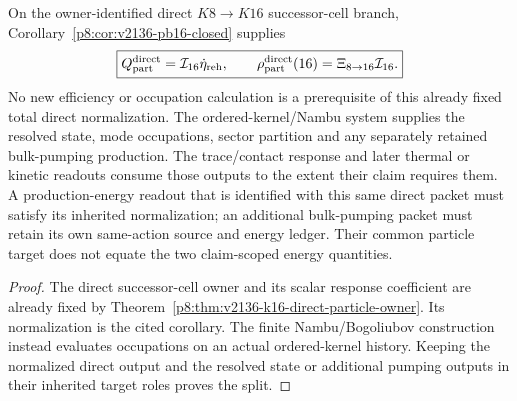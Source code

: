 \documentclass[12pt,a4paper]{article}
\begin{document}
\begin{corollary}
\label{p8:cor:v2186-c06-direct-energy-occupation-split}
On the owner-identified direct $K8\to K16$ successor-cell branch,
Corollary~\ref{p8:cor:v2136-pb16-closed} supplies
\[
 \boxed{Q_{\rm part}^{\rm direct}=\mathcal I_{16}\dot\eta_{\rm reh},
 \qquad \rho_{\rm part}^{\rm direct}(16)
 =\Xi_{8\to16}\mathcal I_{16}.}
\]
No new efficiency or occupation calculation is a prerequisite of this
already fixed total direct normalization. The ordered-kernel/Nambu system
supplies the resolved state, mode occupations, sector partition and any
separately retained bulk-pumping production. The trace/contact response and
later thermal or kinetic readouts consume those outputs to the extent their
claim requires them. A production-energy readout that is identified with
this same direct packet must satisfy its inherited normalization; an
additional bulk-pumping packet must retain its own same-action source and
energy ledger. Their common particle target does not equate the two
claim-scoped energy quantities.
\end{corollary}
\begin{proof}
The direct successor-cell owner and its scalar response coefficient are
already fixed by Theorem~\ref{p8:thm:v2136-k16-direct-particle-owner}.
Its normalization is the cited corollary. The finite Nambu/Bogoliubov
construction instead evaluates occupations on an actual ordered-kernel
history. Keeping the normalized direct output and the resolved state or
additional pumping outputs in their inherited target roles proves the split.
\end{proof}
\end{document}
